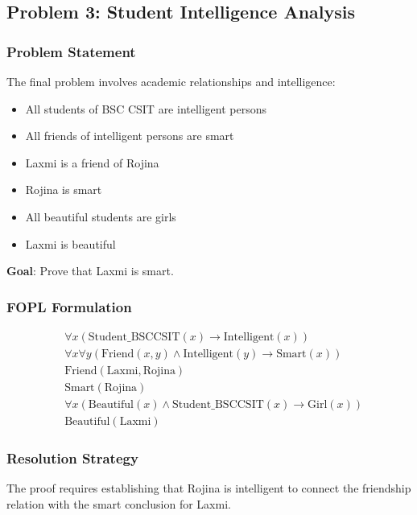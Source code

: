 \documentclass[11pt,a4paper]{article}
\begin{document}
\subsection{Problem 3: Student Intelligence Analysis}

\subsubsection{Problem Statement}

The final problem involves academic relationships and intelligence:
\begin{itemize}
    \item All students of BSC CSIT are intelligent persons
    \item All friends of intelligent persons are smart
    \item Laxmi is a friend of Rojina
    \item Rojina is smart
    \item All beautiful students are girls
    \item Laxmi is beautiful
\end{itemize}

\textbf{Goal}: Prove that Laxmi is smart.

\subsubsection{FOPL Formulation}

\begin{align}
&\forall x (\text{Student\_BSCCSIT}(x) \rightarrow \text{Intelligent}(x)) \\
&\forall x \forall y (\text{Friend}(x,y) \wedge \text{Intelligent}(y) \rightarrow \text{Smart}(x)) \\
&\text{Friend}(\text{Laxmi}, \text{Rojina}) \\
&\text{Smart}(\text{Rojina}) \\
&\forall x (\text{Beautiful}(x) \wedge \text{Student\_BSCCSIT}(x) \rightarrow \text{Girl}(x)) \\
&\text{Beautiful}(\text{Laxmi})
\end{align}

\subsubsection{Resolution Strategy}

The proof requires establishing that Rojina is intelligent to connect the friendship relation with the smart conclusion for Laxmi.
\end{document}
